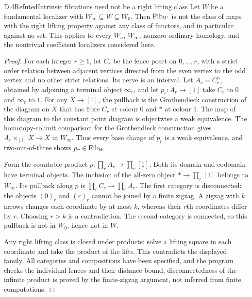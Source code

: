 \begin{claim}{D.4}{Refuted}{Intrinsic fibrations need not be a right lifting class}
Let $W$ be a fundamental localizer with $W_\infty\subseteq W\subseteq W_0$. Then $\mathrm{Fib}_W$ is not the class of maps with the right lifting property against any class of functors, and in particular against no set. This applies to every $W_n$, $W_\infty$, nonzero ordinary homology, and the nontrivial coefficient localizers considered here.
\end{claim}
\begin{proof}
For each integer $r\geq1$, let $C_r$ be the fence poset on $0,\ldots,r$, with a strict order relation between adjacent vertices directed from the even vertex to the odd vertex and no other strict relations. Its nerve is an interval. Let $A_r=C_r^{\triangleright}$, obtained by adjoining a terminal object $\infty_r$, and let $p_r:A_r\to[1]$ take $C_r$ to $0$ and $\infty_r$ to $1$.
For any $X\to[1]$, the pullback is the Grothendieck construction of the diagram on $X$ that has fibre $C_r$ at colour $0$ and $*$ at colour $1$. The map of this diagram to the constant point diagram is objectwise a weak equivalence. The homotopy-colimit comparison for the Grothendieck construction gives $A_r\times_{[1]}X\to X$ in $W_\infty$. Thus every base change of $p_r$ is a weak equivalence, and two-out-of-three shows $p_r\in\mathrm{Fib}_W$.

Form the countable product $p:\prod_rA_r\to\prod_r[1]$. Both its domain and codomain have terminal objects. The inclusion of the all-zero object $*\to\prod_r[1]$ belongs to $W_\infty$. Its pullback along $p$ is $\prod_rC_r\to\prod_rA_r$. The first category is disconnected: the objects $(0)_r$ and $(r)_r$ cannot be joined by a finite zigzag. A zigzag with $k$ arrows changes each coordinate by at most $k$, whereas their $r$th coordinates differ by $r$. Choosing $r>k$ is a contradiction. The second category is connected, so this pullback is not in $W_0$, hence not in $W$.

Any right lifting class is closed under products: solve a lifting square in each coordinate and take the product of the lifts. This contradicts the displayed family. All categories and compositions have been specified, and the program checks the individual fences and their distance bound; disconnectedness of the infinite product is proved by the finite-zigzag argument, not inferred from finite computations.
\end{proof}

